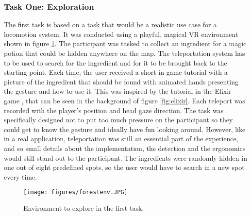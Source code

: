 \subsubsection{Task One: Exploration}
The first task is based on a task that would be a realistic use case for a locomotion system. It was conducted using a playful, magical VR environment shown in figure \ref{fig:forestEnv}. 
The participant was tasked to collect an ingredient for a magic potion that could be hidden anywhere on the map. The teleportation system has to be used to search for the ingredient and for it to be brought back to the starting point. Each time, the user received a short in-game tutorial with a picture of the ingredient that should be found with animated hands presenting the gesture and how to use it. This was inspired by the tutorial in the Elixir game \cite{Magnopus}, that can be seen in the background of figure \ref{fig:elixir}.
Each teleport was recorded with the player's position and head gaze direction. The task was specifically designed not to put too much pressure on the participant so they could get to know the gesture and ideally have fun looking around. However, like in a real application, teleportation was still an essential part of the experience, and so small details about the implementation, the detection and the ergonomics would still stand out to the participant. The ingredients were randomly hidden in one out of eight predefined spots, so the user would have to search in a new spot every time.

\begin{figure}[!ht]
    \centering
    \texttt{[image: figures/forestenv.JPG]}
    \caption{Environment to explore in the first task.}
    \label{fig:forestEnv}
\end{figure}

